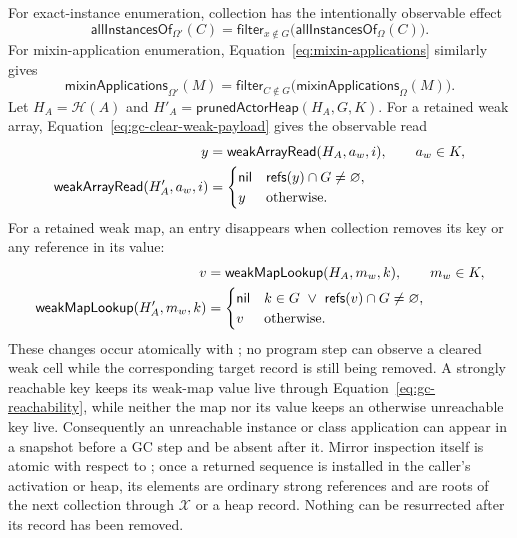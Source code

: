 For exact-instance enumeration, collection has the intentionally observable
effect
\begin{equation}\label{eq:gc-all-instances-effect}
 \mathsf{allInstancesOf}_{\Omega'}(C)=
 \mathsf{filter}_{x\notin G}
   \bigl(\mathsf{allInstancesOf}_{\Omega}(C)\bigr).
\end{equation}
For mixin-application enumeration, Equation~\eqref{eq:mixin-applications}
similarly gives
\begin{equation}\label{eq:gc-mixin-applications-effect}
 \mathsf{mixinApplications}_{\Omega'}(M)=
 \mathsf{filter}_{C\notin G}
   \bigl(\mathsf{mixinApplications}_{\Omega}(M)\bigr).
\end{equation}
Let $H_A=\mathcal H(A)$ and
$H'_A=\mathsf{prunedActorHeap}(H_A,G,K)$.  For a retained weak array,
Equation~\eqref{eq:gc-clear-weak-payload} gives the observable read
\begin{equation}\label{eq:gc-weak-array-effect}
\begin{aligned}
 y&=\mathsf{weakArrayRead}(H_A,a_w,i),\qquad a_w\in K,\\
 \mathsf{weakArrayRead}(H'_A,a_w,i)
  &=\begin{cases}
     \mathsf{nil} & \mathsf{refs}(y)\cap G\ne\varnothing,\\
     y & \text{otherwise.}
    \end{cases}
\end{aligned}
\end{equation}
For a retained weak map, an entry disappears when collection removes its key
or any reference in its value:
\begin{equation}\label{eq:gc-weak-map-effect}
\begin{aligned}
 v&=\mathsf{weakMapLookup}(H_A,m_w,k),\qquad m_w\in K,\\
 \mathsf{weakMapLookup}(H'_A,m_w,k)
  &=\begin{cases}
     \mathsf{nil} & k\in G\ \lor\ \mathsf{refs}(v)\cap G\ne\varnothing,\\
     v & \text{otherwise.}
    \end{cases}
\end{aligned}
\end{equation}
These changes occur atomically with ; no program step can
observe a cleared weak cell while the corresponding target record is still
being removed.  A strongly reachable key keeps its weak-map value live through
Equation~\eqref{eq:gc-reachability}, while neither the map nor its value keeps
an otherwise unreachable key live.
Consequently an unreachable instance or class application can appear in a
snapshot before a GC step and be absent after it.  Mirror inspection itself is
atomic with respect to ; once a returned sequence is
installed in the caller's activation or heap, its elements are ordinary strong
references and are roots of the next collection through $\mathcal X$ or a heap
record.  Nothing can be resurrected after its record has been removed.

